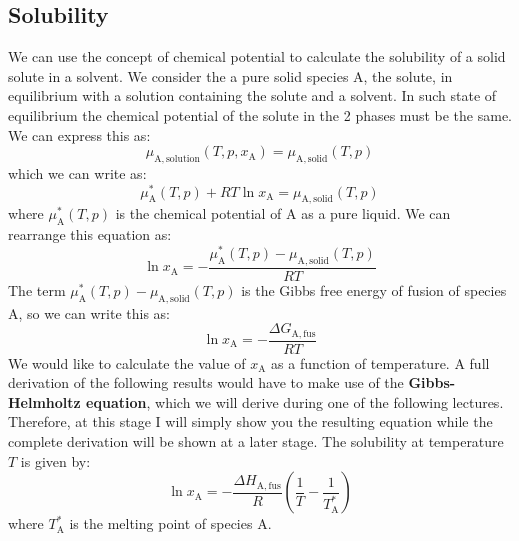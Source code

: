 \documentclass[12pt,a4paper]{report}
\begin{document}
  \subsection*{Solubility}
  We can use the concept of chemical potential to calculate the solubility of a solid solute in a solvent. We consider the a pure solid species A, the solute, in equilibrium with a solution containing the solute and a solvent. In such state of equilibrium the chemical potential of the solute in the 2 phases must be the same. We can express this as:
   \begin{equation*}
   \mu_{\mathrm{A,solution}}(T,p,x_{\mathrm{A}}) = \mu_{\mathrm{A,solid}}(T,p)
   \end{equation*} 
   which we can write as:
   \begin{equation*}
   \mu^{*}_{\mathrm{A}}(T,p)+RT\ln x_{\mathrm{A}} = \mu_{\mathrm{A,solid}}(T,p)
   \end{equation*} 
   where $\mu^{*}_{\mathrm{A}}(T,p)$ is the chemical potential of A as a pure liquid. We can rearrange this equation as:
   \begin{equation*}
   \ln x_{\mathrm{A}} = -\frac{\mu^{*}_{\mathrm{A}}(T,p)-\mu_{\mathrm{A,solid}}(T,p)}{RT}
   \end{equation*} 
   The term $\mu^{*}_{\mathrm{A}}(T,p)-\mu_{\mathrm{A,solid}}(T,p)$ is the Gibbs free energy of fusion of species A, so we can write this as:
   \begin{equation*}
   \ln x_{\mathrm{A}} = -\frac{\Delta G_{\mathrm{A,fus}}}{RT}
   \end{equation*} 
   We would like to calculate the value of $x_{\mathrm{A}}$ as a function of temperature. A full derivation of the following results would have to make use of the \textbf{Gibbs-Helmholtz equation}, which we will derive during one of the following lectures. Therefore, at this stage I will simply show you the resulting equation while the complete derivation will be shown at a later stage. The solubility at temperature $T$ is given by:
   \begin{equation*}
   \ln x_{\mathrm{A}} = -\frac{\Delta H_{\mathrm{A,fus}}}{R}(\frac{1}{T}-\frac{1}{T^{*}_{\mathrm{A}}})
   \end{equation*}
where $T^{*}_{\mathrm{A}}$ is the melting point of species A.
\end{document}
